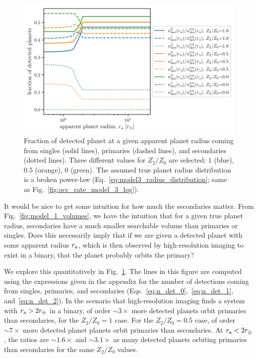 \documentclass[12pt,modern]{aastex61}
\renewcommand{\a}{_{\rm a}}
\begin{document}
\begin{figure}[!t]
    \centering
    \includegraphics[width=\textwidth]{figures/ndet_vs_radius_logx_model_3_fraclines_rpu_22.5_manyZs.pdf}
    \caption{
        Fraction of detected planet at a given apparent planet radius coming 
        from singles (solid lines), primaries (dashed lines), and secondaries 
        (dotted lines).
        Three different values for $Z_2/Z_0$ are selected: $1$ (blue), $0.5$ 
        (orange), $0$ (green).
        The assumed true planet radius distribution is a broken power-law
        (Eq.~\ref{eq:model3_radius_distribution}; same as 
        Fig.~\ref{fig:occ_rate_model_3_log}).
    }
    \label{fig:frac_model_3}
\end{figure}

It would be nice to get some intuition for how much the secondaries matter.
From Fig.~\ref{fig:model_1_volumes}, we have the intuition that for a given 
true planet radius, secondaries have a much smaller searchable volume than 
primaries or singles.
Does this necessarily imply that if we are given a detected planet with some 
apparent radius $r\a$, which is then observed by high-resolution imaging to 
exist in a binary, that the planet probably orbits the primary?

We explore this quantitatively in Fig.~\ref{fig:frac_model_3}.
The lines in this figure are computed using the expressions given in the 
appendix for the number of detections coming from singles, primaries, and 
secondaries (Eqs.~\ref{eq:n_det_0},~\ref{eq:n_det_1}, and~\ref{eq:n_det_2}).
In the scenario that high-resolution imaging finds a system with $r\a > 
2r_\oplus$ in a binary, of order $\sim 3\times$ more detected planets orbit 
primaries than secondaries, for the $Z_2/Z_0=1$ case.
For the $Z_2/Z_0=0.5$ case, of order $\sim 7\times$ more detected planet 
planets orbit primaries than secondaries.
At $r\a < 2r_\oplus$, the ratios are $\sim 1.6 \times$ and $\sim 3.1 \times$ 
as many detected planets orbiting primaries than secondaries for the same 
$Z_2/Z_0$ values.
\end{document}
